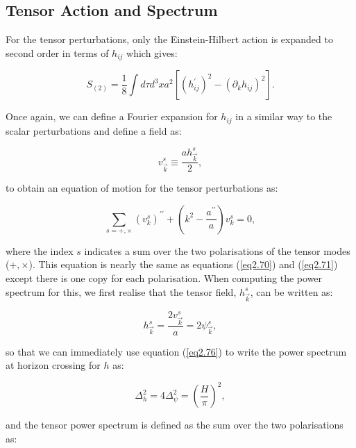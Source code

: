 \documentclass[a4paper,12pt,twoside]{report}
\begin{document}
\subsection{Tensor Action and Spectrum} \label{subsec:TensActSpec}

For the tensor perturbations, only the Einstein-Hilbert action is expanded to second order in terms of $h_{ij}$ which gives:

\begin{equation} \label{eq2.79}
S_{(2)} = \frac{1}{8} \int d\tau d^{3}x a^{2} \left[ (h^{\prime}_{ij})^{2} - (\partial_{k}h_{ij})^{2} \right].
\end{equation}

Once again, we can define a Fourier expansion for $h_{ij}$ in a similar way to the scalar perturbations and define a field as:

\begin{equation} \label{eq2.80}
v^{s}_{\vec{k}} \equiv \frac{a h^{s}_{\vec{k}}}{2},
\end{equation}

to obtain an equation of motion for the tensor perturbations as:

\begin{equation} \label{eq2.81}
\sum_{s = +, \times} (v^{s}_{k})^{\prime \prime} + \left(k^{2} - \frac{a^{\prime \prime}}{a} \right) v^{s}_{k} = 0,
\end{equation}

where the index $s$ indicates a sum over the two polarisations of the tensor modes ($+, \times$). This equation is nearly the same as equations (\ref{eq2.70}) and (\ref{eq2.71}) except there is one copy for each polarisation. When computing the power spectrum for this, we first realise that the tensor field, $h^{s}_{\vec{k}}$, can be written as:

\begin{equation} \label{eq2.82}
h^{s}_{\vec{k}} = \frac{2 v^{s}_{\vec{k}}}{a} = 2 \psi^{s}_{\vec{k}}, 
\end{equation}

so that we can immediately use equation (\ref{eq2.76}) to write the power spectrum at horizon crossing for $h$ as:

\begin{equation} \label{eq2.83}
\Delta^{2}_{h} = 4\Delta^{2}_{\psi} = \left(\frac{H}{\pi}\right)^{2},
\end{equation}

and the tensor power spectrum is defined as the sum over the two polarisations as:
\end{document}
